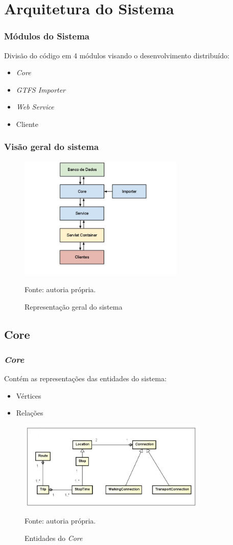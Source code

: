 \section{Arquitetura do Sistema}
\frame
{
\frametitle{Módulos do Sistema}
Divisão do código em 4 módulos visando o desenvolvimento distribuído:
\begin{itemize}
\item \emph{Core}
\item \emph{GTFS Importer}
\item \emph{Web Service}
\item Cliente
\end{itemize}
}

\frame
{
\frametitle{Visão geral do sistema}
\begin{figure}
\includegraphics[width=0.7\textwidth]{./imgs/arquitetura.png}
\caption{Representação geral do sistema}
\tiny
Fonte: autoria própria.
\end{figure}

}

\subsection{Core}
\frame
{
\frametitle{\emph{Core}}
Contém as representações das entidades do sistema:
\begin{itemize}
\item Vértices
\item Relações
\end{itemize}
\begin{figure}
\includegraphics[width=0.8\textwidth]{./imgs/CoreDiagram.png}
\caption{Entidades do \emph{Core}}
\tiny
Fonte: autoria própria.
\end{figure}

}

